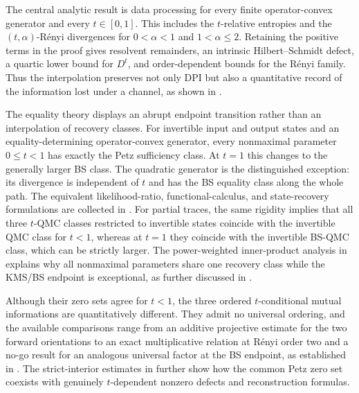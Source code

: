 \documentclass[11pt]{article}
\theoremstyle{remark}
\newcommand{\1}{\mathbbm{1}}
\begin{document}
The central analytic result is data processing for every finite
operator-convex generator and every $t\in[0,1]$.  This includes the
$t$-relative entropies and the $(t,\alpha)$-R\'enyi divergences for
$0<\alpha<1$ and $1<\alpha\leq2$.  Retaining the positive terms in
the proof gives resolvent remainders, an intrinsic Hilbert--Schmidt
defect, a quartic lower bound for $D^t$, and order-dependent bounds for
the R\'enyi family.  Thus the interpolation preserves not only DPI
but also a quantitative record of the information lost under a
channel, as shown in
.

The equality theory displays an abrupt endpoint transition rather
than an interpolation of recovery classes.  For invertible input and
output states and an equality-determining operator-convex generator,
every nonmaximal parameter $0\leq t<1$ has exactly the Petz
sufficiency class.  At $t=1$ this changes to the generally larger BS
class.  The quadratic generator is the distinguished exception: its
divergence is independent of $t$ and has the BS equality class along
the whole path.  The equivalent likelihood-ratio, functional-calculus,
and state-recovery formulations are collected in
.  For partial traces, the same
rigidity implies that all three $t$-QMC classes restricted to
invertible states coincide with the invertible QMC class for $t<1$,
whereas at $t=1$ they coincide with the invertible BS-QMC class,
which can be strictly larger.  The
power-weighted inner-product analysis in
 explains why all
nonmaximal parameters share one recovery class while the KMS/BS
endpoint is exceptional, as further discussed in
.

Although their zero sets agree for $t<1$, the three ordered
$t$-conditional mutual informations are quantitatively different.
They admit no universal ordering, and the available comparisons range
from an additive projective estimate for the two forward orientations
to an exact multiplicative relation at R\'enyi order two and a no-go
result for an analogous universal factor at the BS endpoint, as established in
.
The strict-interior estimates in
 further show how
the common Petz zero set coexists with genuinely $t$-dependent
nonzero defects and reconstruction formulas.
\end{document}
